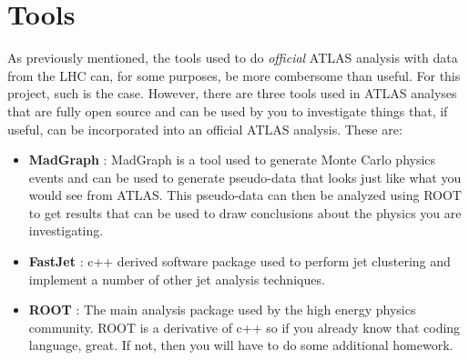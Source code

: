 \documentclass[12pt]{article}
\begin{document}
\section{Tools}
As previously mentioned, the tools used to do \textit{official} ATLAS analysis with data from the LHC can, for some purposes, be more combersome than useful.  For this project, such is the case.  However, there are three tools used in ATLAS analyses that are fully open source and can be used by you to investigate things that, if useful, can be incorporated into an official ATLAS analysis.  These are:
\begin{itemize}
 \item \textbf{MadGraph} : MadGraph is a tool used to generate Monte Carlo physics events and can be used to generate pseudo-data that looks just like what you would see from ATLAS.  This pseudo-data can then be analyzed using ROOT to get results that can be used to draw conclusions about the physics you are investigating.
 \item \textbf{FastJet} : c++ derived software package used to perform jet clustering and implement a number of other jet analysis techniques.
 \item \textbf{ROOT}  : The main analysis package used by the high energy physics community.  ROOT is a derivative of c++ so if you already know that coding language, great.  If not, then you will have to do some additional homework.
\end{itemize}
\end{document}
